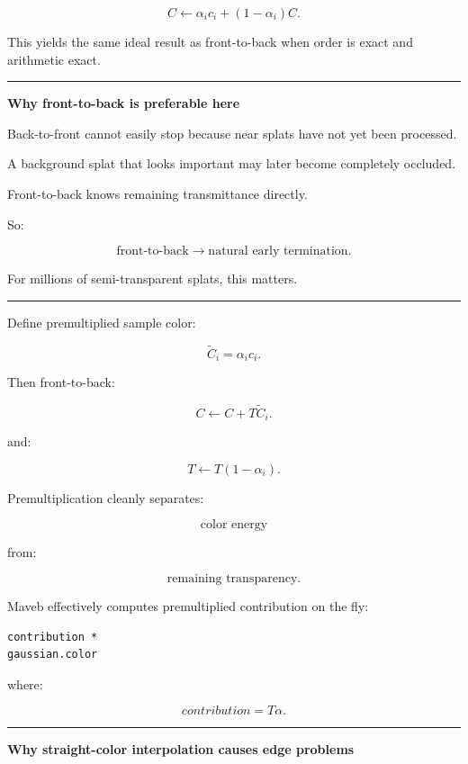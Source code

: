 \[
\boxed{
C
\leftarrow
\alpha_i c_i
+
(1-\alpha_i)C.
}
\]

This yields the same ideal result as front-to-back when order is exact and arithmetic exact.

\begin{center}\rule{0.5\linewidth}{0.5pt}\end{center}

\textbf{Why front-to-back is preferable here}

Back-to-front cannot easily stop because near splats have not yet been processed.

A background splat that looks important may later become completely occluded.

Front-to-back knows remaining transmittance directly.

So:

\[
\boxed{
\text{front-to-back}
\rightarrow
\text{natural early termination}.
}
\]

For millions of semi-transparent splats, this matters.

\begin{center}\rule{0.5\linewidth}{0.5pt}\end{center}

Define premultiplied sample color:

\[
\tilde C_i
=
\alpha_i c_i.
\]

Then front-to-back:

\[
C
\leftarrow
C+
T\tilde C_i.
\]

and:

\[
T
\leftarrow
T(1-\alpha_i).
\]

Premultiplication cleanly separates:

\[
\text{color energy}
\]

from:

\[
\text{remaining transparency}.
\]

Maveb effectively computes premultiplied contribution on the fly:

\begin{verbatim}
contribution *
gaussian.color
\end{verbatim}

where:

\[
contribution=T\alpha.
\]

\begin{center}\rule{0.5\linewidth}{0.5pt}\end{center}

\textbf{Why straight-color interpolation causes edge problems}

